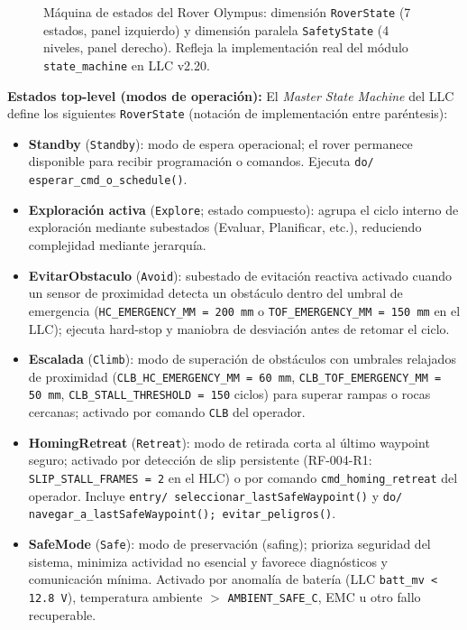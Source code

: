 \begin{landscape}
\begin{figure}[H]
\begin{tikzpicture}
    \end{tikzpicture}
    \caption{Máquina de estados del Rover Olympus: dimensión \texttt{RoverState} (7 estados, panel izquierdo) y dimensión paralela \texttt{SafetyState} (4 niveles, panel derecho). Refleja la implementación real del módulo \texttt{state\_machine} en LLC v2.20.}
    \label{fig:maquina_estados}
\end{figure}
\end{landscape}

\textbf{Estados top-level (modos de operación):} El \emph{Master State Machine} del LLC define los siguientes \texttt{RoverState} (notación de implementación entre paréntesis):
\begin{itemize}
  \item \textbf{Standby} (\texttt{Standby}): modo de espera operacional; el rover permanece disponible para recibir programación o comandos. Ejecuta \texttt{do/ esperar\_cmd\_o\_schedule()}. \cite{UMLStateMachinesConcepts1}
  \item \textbf{Exploración activa} (\texttt{Explore}; estado compuesto): agrupa el ciclo interno de exploración mediante subestados (Evaluar, Planificar, etc.), reduciendo complejidad mediante jerarquía. \cite{CompositeStates1,UMLStateMachinesConcepts2}
  \item \textbf{EvitarObstaculo} (\texttt{Avoid}): subestado de evitación reactiva activado cuando un sensor de proximidad detecta un obstáculo dentro del umbral de emergencia (\texttt{HC\_EMERGENCY\_MM = 200\,mm} o \texttt{TOF\_EMERGENCY\_MM = 150\,mm} en el LLC); ejecuta hard-stop y maniobra de desviación antes de retomar el ciclo. \cite{UMLStateMachinesConcepts2}
  \item \textbf{Escalada} (\texttt{Climb}): modo de superación de obstáculos con umbrales relajados de proximidad (\texttt{CLB\_HC\_EMERGENCY\_MM = 60\,mm}, \texttt{CLB\_TOF\_EMERGENCY\_MM = 50\,mm}, \texttt{CLB\_STALL\_THRESHOLD = 150} ciclos) para superar rampas o rocas cercanas; activado por comando \texttt{CLB} del operador. \cite{UMLStateMachinesConcepts1}
  \item \textbf{HomingRetreat} (\texttt{Retreat}): modo de retirada corta al último waypoint seguro; activado por detección de slip persistente (RF-004-R1: \texttt{SLIP\_STALL\_FRAMES = 2} en el HLC) o por comando \texttt{cmd\_homing\_retreat} del operador. Incluye \texttt{entry/ seleccionar\_lastSafeWaypoint()} y \texttt{do/ navegar\_a\_lastSafeWaypoint(); evitar\_peligros()}. \cite{UMLStateMachinesConcepts2,SafeModeContext1}
  \item \textbf{SafeMode} (\texttt{Safe}): modo de preservación (safing); prioriza seguridad del sistema, minimiza actividad no esencial y favorece diagnósticos y comunicación mínima. Activado por anomalía de batería (LLC \texttt{batt\_mv < 12.8\,V}), temperatura ambiente $>$ \texttt{AMBIENT\_SAFE\_C}, EMC u otro fallo recuperable. \cite{SafeModeContext1,UMLStateMachinesConcepts2}

\end{itemize}

